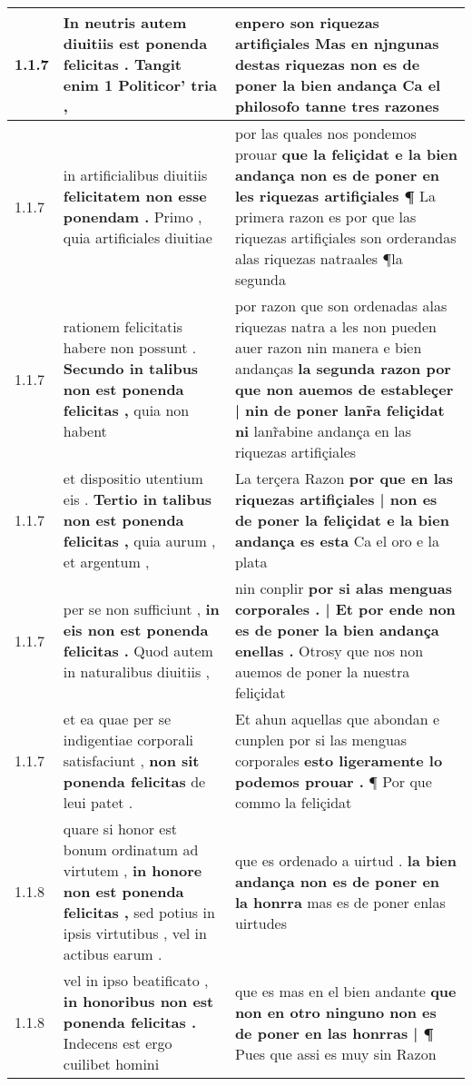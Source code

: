\begin{tabular}{|p{1cm}|p{6.5cm}|p{6.5cm}|}
1.1.7 & In neutris autem diuitiis \textbf{ est ponenda felicitas . } Tangit enim 1 Politicor’ tria , & enpero son riquezas artifiçiales \textbf{ Mas en njngunas destas riquezas non es de poner la bien andança } Ca el philosofo tanne tres razones \\\hline
1.1.7 & in artificialibus diuitiis \textbf{ felicitatem non esse ponendam . } Primo , quia artificiales diuitiae & por las quales nos pondemos prouar \textbf{ que la feliçidat e la bien andança non es de poner en les riquezas artifiçiales ¶ } La primera razon es por que las riquezas artifiçiales son orderandas alas riquezas natraales ¶la segunda \\\hline
1.1.7 & rationem felicitatis habere non possunt . \textbf{ Secundo in talibus non est ponenda felicitas , } quia non habent & por razon que son ordenadas alas riquezas natra a les non pueden auer razon nin manera e bien andanças \textbf{ la segunda razon por que non auemos de estableçer | nin de poner lanr̃a feliçidat ni } lanr̃abine andança en las riquezas artifiçiales \\\hline
1.1.7 & et dispositio utentium eis . \textbf{ Tertio in talibus non est ponenda felicitas , } quia aurum , et argentum , & La terçera Razon \textbf{ por que en las riquezas artifiçiales | non es de poner la feliçidat e la bien andança es esta } Ca el oro e la plata \\\hline
1.1.7 & per se non sufficiunt , \textbf{ in eis non est ponenda felicitas . } Quod autem in naturalibus diuitiis , & nin conplir \textbf{ por si alas menguas corporales . | Et por ende non es de poner la bien andança enellas . } Otrosy que nos non auemos de poner la nuestra feliçidat \\\hline
1.1.7 & et ea quae per se indigentiae corporali satisfaciunt , \textbf{ non sit ponenda felicitas } de leui patet . & Et ahun aquellas que abondan e cunplen por si las menguas corporales \textbf{ esto ligeramente lo podemos prouar . } ¶ Por que commo la feliçidat \\\hline
1.1.8 & quare si honor est bonum ordinatum ad virtutem , \textbf{ in honore non est ponenda felicitas , } sed potius in ipsis virtutibus , vel in actibus earum . & que es ordenado a uirtud . \textbf{ la bien andança non es de poner en la honrra } mas es de poner enlas uirtudes \\\hline
1.1.8 & vel in ipso beatificato , \textbf{ in honoribus non est ponenda felicitas . } Indecens est ergo cuilibet homini & que es mas en el bien andante \textbf{ que non en otro ninguno non es de poner en las honrras | ¶ } Pues que assi es muy sin Razon \\\hline

\end{tabular}
